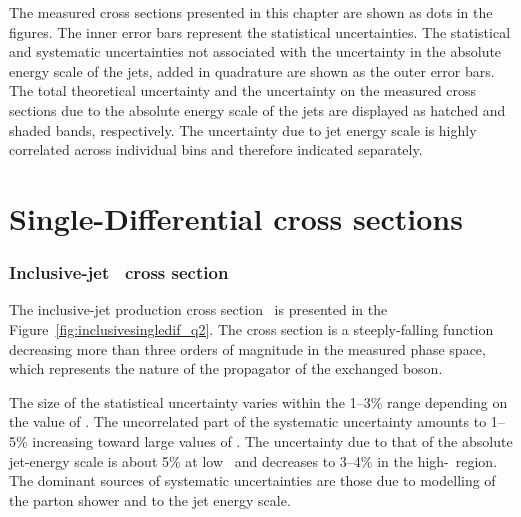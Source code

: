 The measured cross sections presented in this chapter are shown as dots in the figures. The inner error bars represent the statistical uncertainties. The statistical and systematic uncertainties not associated with the uncertainty in the absolute energy scale of the jets, added in quadrature are shown as the outer error bars. The total theoretical uncertainty and the uncertainty on the measured cross sections due to the absolute energy scale of the jets are displayed as hatched and shaded bands, respectively. The uncertainty due to jet energy scale is highly correlated across individual bins and therefore indicated separately.

\section{Single-Differential cross sections}
\subsubsection*{Inclusive-jet \dsdqsq~cross section}
The inclusive-jet production cross section \dsdqsq~is presented in the Figure~\ref{fig:inclusivesingledif_q2}. The cross section is a steeply-falling function decreasing more than three orders of magnitude in the measured phase space, which represents the nature of the propagator of the exchanged boson.

The size of the statistical uncertainty varies within the 1--3\% range depending on the value of \qsq. The uncorrelated part of the systematic uncertainty amounts to 1--5\% increasing toward large values of \qsq. The uncertainty due to that of the absolute jet-energy scale is about 5\% at low \qsq~and decreases to 3--4\% in the high-\qsq~region. The dominant sources of systematic uncertainties are those due to modelling of the parton shower and to the jet energy scale.

